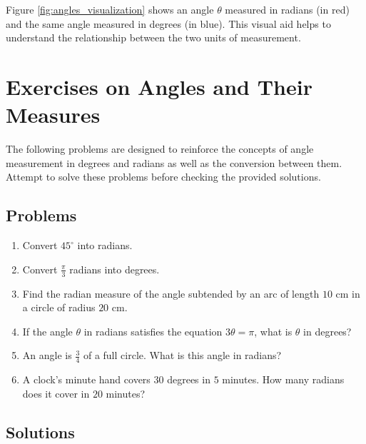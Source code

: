 \documentclass[a4paper,12pt]{book}
\newcounter{problem}
\begin{document}
Figure \ref{fig:angles_visualization} shows an angle $\theta$ measured in radians (in red) and the same angle measured in degrees (in blue). This visual aid helps to understand the relationship between the two units of measurement.


\section{Exercises on Angles and Their Measures}
\label{sec:exercises_angles_measure}

The following problems are designed to reinforce the concepts of angle measurement in degrees and radians as well as the conversion between them. Attempt to solve these problems before checking the provided solutions.

\subsection{Problems}
\label{subsec:problems_angles_measure}

\begin{enumerate}
    \item Convert \(45^\circ\) into radians.
    \item Convert \(\frac{\pi}{3}\) radians into degrees.
    \item Find the radian measure of the angle subtended by an arc of length \(10\) cm in a circle of radius \(20\) cm.
    \item If the angle \( \theta \) in radians satisfies the equation \( 3\theta = \pi \), what is \( \theta \) in degrees?
    \item An angle is \( \frac{3}{4} \) of a full circle. What is this angle in radians?
    \item A clock’s minute hand covers \(30\) degrees in \(5\) minutes. How many radians does it cover in \(20\) minutes?
\end{enumerate}

\subsection{Solutions}
\label{subsec:solutions_angles_measure}
\end{document}
